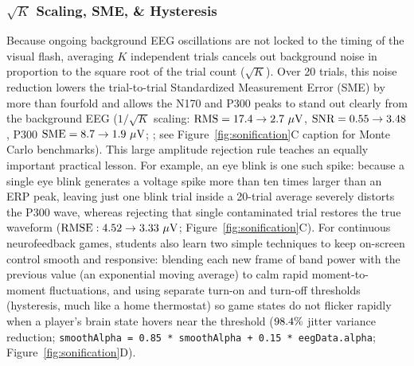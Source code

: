 \documentclass[11pt]{article}
\begin{document}
\subsubsection{$\sqrt{K}$ Scaling, SME, \& Hysteresis}
Because ongoing background EEG oscillations are not locked to the timing of the visual flash, averaging $K$ independent trials cancels out background noise in proportion to the square root of the trial count ($\sqrt{K}$). Over 20 trials, this noise reduction lowers the trial-to-trial Standardized Measurement Error (SME) by more than fourfold and allows the N170 and P300 peaks to stand out clearly from the background EEG ($1/\sqrt{K}$ scaling: $\text{RMS} = 17.4 \rightarrow 2.7\ \mu\text{V}$, $\text{SNR} = 0.55 \rightarrow 3.48$, P300 $\text{SME} = 8.7 \rightarrow 1.9\ \mu\text{V}$; \citealp{luck2021standardized,schubert2023enhancing}; see Figure~\ref{fig:sonification}C caption for Monte Carlo benchmarks). This large amplitude rejection rule teaches an equally important practical lesson. For example, an eye blink is one such spike: because a single eye blink generates a voltage spike more than ten times larger than an ERP peak, leaving just one blink trial inside a 20-trial average severely distorts the P300 wave, whereas rejecting that single contaminated trial restores the true waveform ($\text{RMSE}: 4.52 \rightarrow 3.33\ \mu\text{V}$; Figure~\ref{fig:sonification}C). For continuous neurofeedback games, students also learn two simple techniques to keep on-screen control smooth and responsive: blending each new frame of band power with the previous value (an exponential moving average) to calm rapid moment-to-moment fluctuations, and using separate turn-on and turn-off thresholds (hysteresis, much like a home thermostat) so game states do not flicker rapidly when a player's brain state hovers near the threshold ($98.4\%$ jitter variance reduction; \texttt{smoothAlpha = 0.85 * smoothAlpha + 0.15 * eegData.alpha}; Figure~\ref{fig:sonification}D).
\end{document}
